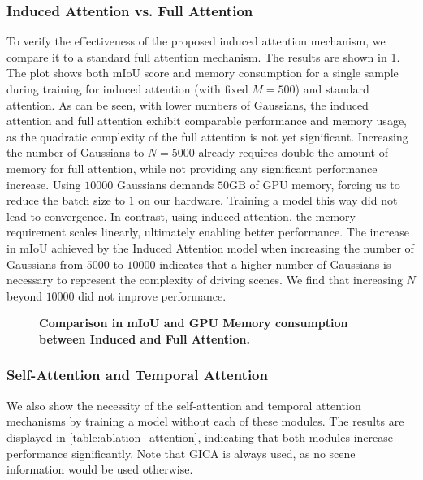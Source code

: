\documentclass[10pt,twocolumn,letterpaper]{article}
\begin{document}
\subsubsection{Induced Attention vs. Full Attention} \label{sec:ablation_induced}
To verify the effectiveness of the proposed induced attention mechanism, we compare it to a standard full attention mechanism.
The results are shown in \cref{fig:ablation_induced}.
The plot shows both mIoU score and memory consumption for a single sample during training for induced attention (with fixed $M=500$) and standard attention.
As can be seen, with lower numbers of Gaussians, the induced attention and full attention exhibit comparable performance and memory usage, as the quadratic complexity of the full attention is not yet significant.
Increasing the number of Gaussians to $N=5000$ already requires double the amount of memory for full attention, while not providing any significant performance increase.
Using $10000$ Gaussians demands $50\mathrm{GB}$ of GPU memory, forcing us to reduce the batch size to $1$ on our hardware.
Training a model this way did not lead to convergence.
In contrast, using induced attention, the memory requirement scales linearly, ultimately enabling better performance.
The increase in mIoU achieved by the Induced Attention model when increasing the number of Gaussians from $5000$ to $10000$ indicates that a higher number of Gaussians is necessary to represent the complexity of driving scenes.
We find that increasing $N$ beyond $10000$ did not improve performance.

\begin{figure}
    \centering
	\caption{
		\textbf{Comparison in mIoU and GPU Memory consumption between Induced and Full Attention.}}
	\label{fig:ablation_induced}
\end{figure}

\subsubsection{Self-Attention and Temporal Attention}
We also show the necessity of the self-attention and temporal attention mechanisms by training a model without each of these modules.
The results are displayed in \cref{table:ablation_attention}, indicating that both modules increase performance significantly.
Note that GICA is always used, as no scene information would be used otherwise.
\end{document}
